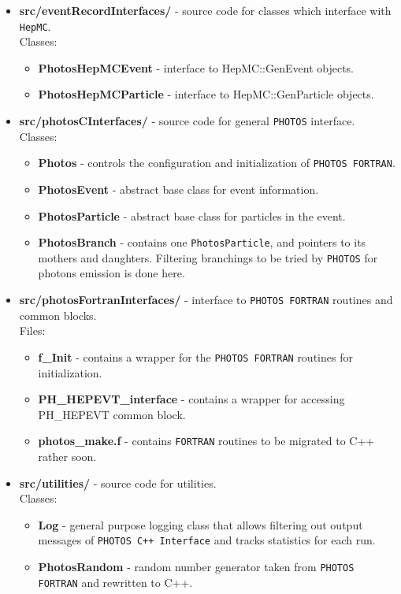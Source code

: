 \documentclass[]{Photos_interface_design}
\begin{document}
\begin{itemize}
\item {\bf src/eventRecordInterfaces/ } - source code for classes which interface with {\tt HepMC}.\\
  Classes:
  \begin{itemize}
  \item { \bf PhotosHepMCEvent} - interface to HepMC::GenEvent objects. 
  \item { \bf PhotosHepMCParticle} - interface to HepMC::GenParticle objects. 
  \end{itemize}   

\item {\bf src/photosCInterfaces/ } - source code for general {\tt PHOTOS} interface.  \\
  Classes:
  \begin{itemize}
  \item { \bf Photos } - controls the configuration and initialization of {\tt PHOTOS FORTRAN}.
  \item { \bf PhotosEvent } - abstract base class for event information.
  \item { \bf PhotosParticle } - abstract base class for particles in the event.
  \item { \bf PhotosBranch } - contains one {\tt PhotosParticle}, and  pointers to its mothers and daughters.
  Filtering branchings to be tried by {\tt PHOTOS} for photons emission is done here.
  \end{itemize}

\item {\bf src/photosFortranInterfaces/ } -  interface to {\tt PHOTOS FORTRAN} routines and common blocks. \\
  Files:
    \begin{itemize}
    \item { \bf f\_Init } - contains a wrapper for the {\tt PHOTOS FORTRAN} routines for initialization.
    \item { \bf PH\_HEPEVT\_interface } - contains a wrapper for accessing PH\_HEPEVT common block.
    \item { \bf photos\_make.f } - contains  {\tt FORTRAN} routines to be  migrated to C++ rather soon.
    \end{itemize}

\item {\bf src/utilities/ } - source code for utilities.\\
  Classes:
  \begin{itemize}
  \item { \bf Log} - general purpose logging class that allows filtering out output messages 
      of {\tt PHOTOS C++ Interface} and tracks statistics for each run.
  \item { \bf PhotosRandom} - random number generator taken from {\tt PHOTOS FORTRAN} and rewritten to C++.
  \end{itemize}   


\end{itemize}
\end{document}

